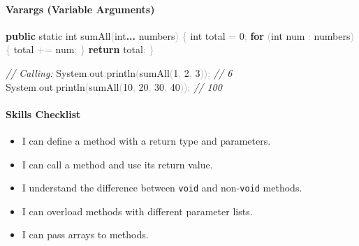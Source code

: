 \documentclass[
  justified,
  openright,
]{tufte-book}
\let\subsection\paragraph
\let\paragraph\paragraph
\newcommand{\KeywordTok}[1]{\textcolor{CodeKeyword}{\textbf{#1}}}  %
\newcommand{\CommentTok}[1]{\textcolor{CodeComment}{\textit{#1}}}  %
\newcommand{\CodeNumTok}[1]{\textcolor{CodeNumber}{#1}}             %
\newcommand{\CodeFuncTok}[1]{\textcolor{CodeKeyword}{#1}}           %
\newcommand{\CodeTypeTok}[1]{\textcolor{CodeType}{#1}}              %
\newcommand{\OperatorTok}[1]{\textcolor{DarkGray}{#1}}              %
\newenvironment{Shaded}{%
  \begin{mdframed}[style=TufteCode]%
}{%
  \end{mdframed}%
}
\let\subsection\paragraph
\let\paragraph\paragraph
\providecommand{\tightlist}{%
  \setlength{\itemsep}{0pt}\setlength{\parskip}{0pt}}
\begin{document}
\subsection{Varargs (Variable
Arguments)}\label{varargs-variable-arguments}

\begin{Shaded}
\begin{Highlighting}[]
\KeywordTok{public} \CodeTypeTok{static} \CodeTypeTok{int} \CodeFuncTok{sumAll}\OperatorTok{(}\CodeTypeTok{int}\KeywordTok{...} numbers\OperatorTok{)} \OperatorTok{\{}
    \CodeTypeTok{int} total \OperatorTok{=} \CodeNumTok{0}\OperatorTok{;}
    \KeywordTok{for} \OperatorTok{(}\CodeTypeTok{int} num \OperatorTok{:} numbers\OperatorTok{)} \OperatorTok{\{}
        total \OperatorTok{+=} num\OperatorTok{;}
    \OperatorTok{\}}
    \KeywordTok{return} total\OperatorTok{;}
\OperatorTok{\}}
 
\CommentTok{// Calling:}
System\OperatorTok{.}\CodeFuncTok{out}\OperatorTok{.}\CodeFuncTok{println}\OperatorTok{(}\CodeFuncTok{sumAll}\OperatorTok{(}\CodeNumTok{1}\OperatorTok{,} \CodeNumTok{2}\OperatorTok{,} \CodeNumTok{3}\OperatorTok{));}          \CommentTok{// 6}
System\OperatorTok{.}\CodeFuncTok{out}\OperatorTok{.}\CodeFuncTok{println}\OperatorTok{(}\CodeFuncTok{sumAll}\OperatorTok{(}\CodeNumTok{10}\OperatorTok{,} \CodeNumTok{20}\OperatorTok{,} \CodeNumTok{30}\OperatorTok{,} \CodeNumTok{40}\OperatorTok{));}    \CommentTok{// 100}
\end{Highlighting}
\end{Shaded}

\subsection{Skills Checklist}\label{skills-checklist-81}

\begin{itemize}
\tightlist
\item[$\square$]
  I can define a method with a return type and parameters.
\item[$\square$]
  I can call a method and use its return value.
\item[$\square$]
  I understand the difference between \texttt{void} and
  non-\texttt{void} methods.
\item[$\square$]
  I can overload methods with different parameter lists.
\item[$\square$]
  I can pass arrays to methods.
\end{itemize}
\end{document}
